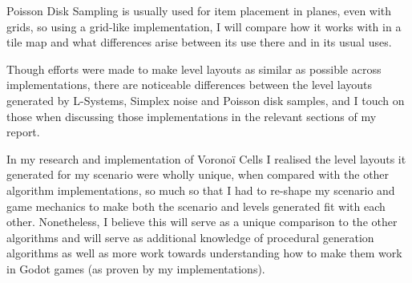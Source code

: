 Poisson Disk Sampling is usually used for item placement in planes, even with grids, so using a grid-like implementation, I will compare how it works with in a tile map and what differences arise between its use there and in its usual uses.

Though efforts were made to make level layouts as similar as possible across implementations, there are noticeable differences between the level layouts generated by L-Systems, Simplex noise and Poisson disk samples, and I touch on those when discussing those implementations in the relevant sections of my report.

In my research and implementation of Voronoï Cells I realised the level layouts it generated for my scenario were wholly unique, when compared with the other algorithm implementations, so much so that I had to re-shape my scenario and game mechanics to make both the scenario and levels generated fit with each other. Nonetheless, I believe this will serve as a unique comparison to the other algorithms and will serve as additional knowledge of procedural generation algorithms as well as more work towards understanding how to make them work in Godot games (as proven by my implementations).